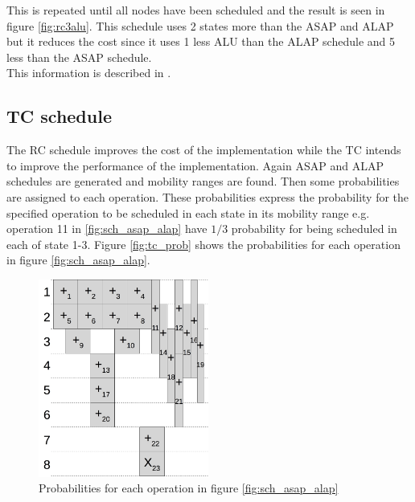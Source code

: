 This is repeated until all nodes have been scheduled and the result is seen in figure \vref{fig:rc3alu}. This schedule uses 2 states more than the ASAP and ALAP but it reduces the cost since it uses 1 less ALU than the ALAP schedule and 5 less than the ASAP schedule.  \\
This information is described in \cite{gajski2009}.

\subsection{TC schedule}
The RC schedule improves the cost of the implementation while the TC intends to improve the performance of the implementation. Again ASAP and ALAP schedules are generated and mobility ranges are found. Then some probabilities are assigned to each operation. These probabilities express the probability for the specified operation to be scheduled in each state in its mobility range e.g. operation 11 in \vref{fig:sch_asap_alap} have $1/3$ probability for being scheduled in each of state 1-3. Figure \vref{fig:tc_prob} shows the probabilities for each operation in figure \vref{fig:sch_asap_alap}.
\begin{figure}[ht!]
  \centering
  \includegraphics[height=6.5cm]{figures/tcscheprob}
  \caption{Probabilities for each operation in figure \vref{fig:sch_asap_alap}}
  \label{fig:tc_prob}
\end{figure}



